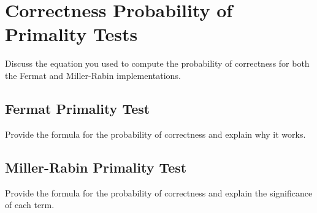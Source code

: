\documentclass[12pt]{article}
\begin{document}
\section{Correctness Probability of Primality Tests}
Discuss the equation you used to compute the probability of correctness for both the Fermat and Miller-Rabin implementations.

\subsection{Fermat Primality Test}
Provide the formula for the probability of correctness and explain why it works.

\subsection{Miller-Rabin Primality Test}
Provide the formula for the probability of correctness and explain the significance of each term.
\end{document}
